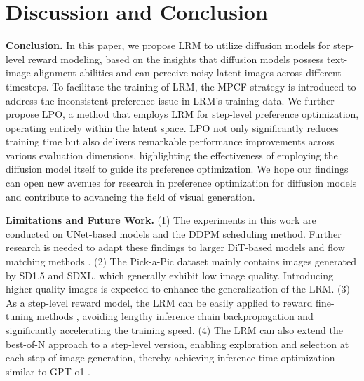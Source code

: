 \section{Discussion and Conclusion}
\label{sec:discussion}


\textbf{Conclusion.} In this paper, we propose LRM to utilize diffusion models for step-level reward modeling, based on the insights that diffusion models possess text-image alignment abilities and can perceive noisy latent images across different timesteps. To facilitate the training of LRM, the MPCF strategy is introduced to address the inconsistent preference issue in LRM's training data. We further propose LPO, a method that employs LRM for step-level preference optimization, operating entirely within the latent space. LPO not only significantly reduces training time but also delivers remarkable performance improvements across various evaluation dimensions, highlighting the effectiveness of employing the diffusion model itself to guide its preference optimization. We hope our findings can open new avenues for research in preference optimization for diffusion models and contribute to advancing the field of visual generation.

\textbf{Limitations and Future Work.} (1) The experiments in this work are conducted on UNet-based models and the DDPM scheduling method. Further research is needed to adapt these findings to larger DiT-based models \cite{sd3} and flow matching methods \cite{flow_match}. (2) The Pick-a-Pic dataset mainly contains images generated by SD1.5 and SDXL, which generally exhibit low image quality. Introducing higher-quality images is expected to enhance the generalization of the LRM. (3) As a step-level reward model, the LRM can be easily applied to reward fine-tuning methods \cite{alignprop, draft}, avoiding lengthy inference chain backpropagation and significantly accelerating the training speed. (4) The LRM can also extend the best-of-N approach to a step-level version, enabling exploration and selection at each step of image generation, thereby achieving inference-time optimization similar to GPT-o1 \cite{gpt_o1}.